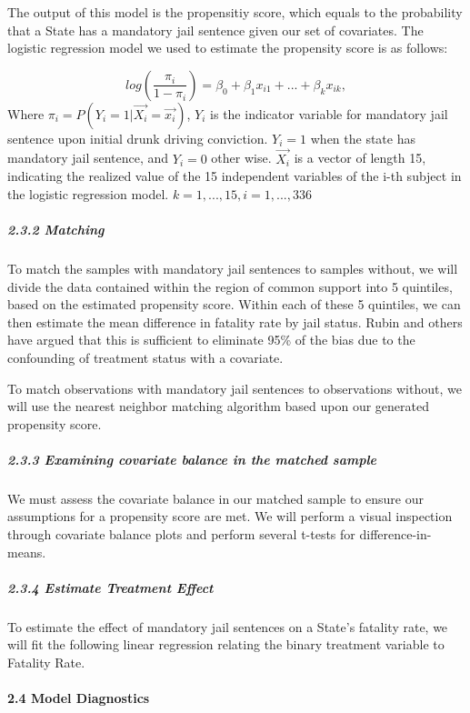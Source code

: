 \documentclass[]{article}
\let\oldparagraph\paragraph
\renewcommand{\paragraph}[1]{\oldparagraph{#1}\mbox{}}
\let\oldsubparagraph\subparagraph
\renewcommand{\subparagraph}[1]{\oldsubparagraph{#1}\mbox{}}
\begin{document}
The output of this model is the propensitiy score, which equals to the probability that a State has a mandatory jail sentence given our set of covariates. The logistic regression model we used to estimate the propensity score is as follows:

\[
log(\frac{\pi_i}{1-\pi_i}) = \beta_0 + \beta_1x_{i1} + ... + \beta_kx_{ik}, 
\]
Where \(\pi_i = P(Y_i = 1 | \overrightarrow{X_i} = \overrightarrow{x_i})\), \(Y_i\) is the indicator variable for mandatory jail sentence upon initial drunk driving conviction. \(Y_i = 1\) when the state has mandatory jail sentence, and \(Y_i = 0\) other wise. \(\overrightarrow{X_i}\) is a vector of length 15, indicating the realized value of the 15 independent variables of the i-th subject in the logistic regression model. \(k = 1, ..., 15, i = 1,...,336\)

\hypertarget{matching}{%
\subparagraph{2.3.2 Matching}\label{matching}}

To match the samples with mandatory jail sentences to samples without, we will divide the data contained within the region of common support into 5 quintiles, based on the estimated propensity score. Within each of these 5 quintiles, we can then estimate the mean difference in fatality rate by jail status. Rubin and others have argued that this is sufficient to eliminate 95\% of the bias due to the confounding of treatment status with a covariate.

To match observations with mandatory jail sentences to observations without, we will use the nearest neighbor matching algorithm based upon our generated propensity score.

\hypertarget{examining-covariate-balance-in-the-matched-sample-1}{%
\subparagraph{2.3.3 Examining covariate balance in the matched sample}\label{examining-covariate-balance-in-the-matched-sample-1}}

We must assess the covariate balance in our matched sample to ensure our assumptions for a propensity score are met. We will perform a visual inspection through covariate balance plots and perform several t-tests for difference-in-means.

\hypertarget{estimate-treatment-effect}{%
\subparagraph{2.3.4 Estimate Treatment Effect}\label{estimate-treatment-effect}}

To estimate the effect of mandatory jail sentences on a State's fatality rate, we will fit the following linear regression relating the binary treatment variable to Fatality Rate.

\hypertarget{model-diagnostics}{%
\paragraph{2.4 Model Diagnostics}\label{model-diagnostics}}
\end{document}
